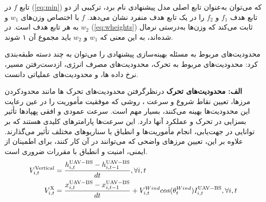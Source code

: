 تابع $f$ در (\autoref{eq:min}) که می‌توان به‌عنوان تابع اصلی مدل پیشنهادی نام برد، ترکیبی از دو تابع هدف  $f_{1}$ و $f_{2}$ را در یک تابع هدف منفرد نشان می‌دهد. $f$ با اختصاص وزن‌های $w_{1}$ و $w_{2}$ به هر تابع هدف است. در (\autoref{eq:wheights}) ثابت می‌کند که وزن‌ها به‌درستی نرمال شده‌اند، به این معنی که $w_{1}$ و $w_{2}$ باید مجموع آن ۱ شوند. 

محدودیت‌های مربوط به مسئله بهینه‌سازی پیشنهادی را می‌توان به چند دسته طبقه‌بندی کرد: محدودیت‌های مربوط به تحرک، محدودیت‌های مصرف انرژی، ازدست‌رفتن مسیر، نرخ داده ها، و محدودیت‌های عملیاتی دانست.

\textbf{الف: محدودیت‌های تحرک}
درنظرگرفتن محدودیت‌های تحرک ها مانند محدودکردن مرزها، تعیین نقاط شروع  و سرعت ، روشی که موفقیت مأموریت را در عین رعایت این محدودیت‌ها بهینه می‌کنند، بسیار مهم است. سرعت عمودی و افقی پهپادها تأثیر بسزایی در تحرک و عملکرد آنها دارد. این سرعت‌ها پارامترهای کلیدی هستند که بر توانایی  در جهت‌یابی، انجام مأموریت‌ها و انطباق با سناریوهای مختلف تأثیر می‌گذارند. علاوه بر این، تعیین مرزهای واضحی که  می‌توانند در آن کار کنند، برای اطمینان از ایمنی، امنیت و انطباق با مقررات ضروری است.
\begin{align}
\label{eq:vvertical}
V_{i,t}^{\mathrm{Vertical}}&=\frac{h_{i,t}^{\mathrm \mathrm{ \mathrm{{UAV-BS}}}} - h_{i,t-1}^{\mathrm \mathrm{ \mathrm{{UAV-BS}}}}}{dt},   \forall i,t \\
\label{eq:VX_speed}
V_{i,t}^{ \mathrm{X}}&=\frac{x_{i,t}^{ \mathrm \mathrm{ \mathrm{{UAV-BS}}}} - x_{i,t-1}^ \mathrm{ \mathrm{{UAV-BS}}}}{dt}+ V_{i,t}^{Wind} cos(\theta _{t}^{Wind})I_{i,t}^ \mathrm{ \mathrm{{UAV-BS}}},   \forall i,t
\end{align} 





